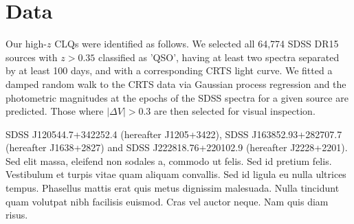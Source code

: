 \documentclass[a4paper,fleqn,usenatbib]{mnras}
\begin{document}
\section{Data}
Our high-$z$ CLQs were identified as follows. 
We selected all 64,774 SDSS DR15 sources with $z > 0.35$ classified as
'QSO', having at least two spectra separated by at least 100 days, and
with a corresponding CRTS light curve. We fitted a damped random walk
to the CRTS data via Gaussian process regression and the photometric
magnitudes at the epochs of the SDSS spectra for a given source are
predicted. Those where $|\Delta V| > 0.3$ are then selected for visual
inspection.

SDSS J120544.7+342252.4  (hereafter J1205+3422), 
SDSS J163852.93+282707.7 (hereafter J1638+2827) and
SDSS J222818.76+220102.9 (hereafter J2228+2201). 
Sed elit massa, eleifend non sodales a, commodo ut felis. Sed id
pretium felis. Vestibulum et turpis vitae quam aliquam convallis. Sed
id ligula eu nulla ultrices tempus. Phasellus mattis erat quis metus
dignissim malesuada. Nulla tincidunt quam volutpat nibh facilisis
euismod. Cras vel auctor neque. Nam quis diam risus.
\end{document}

